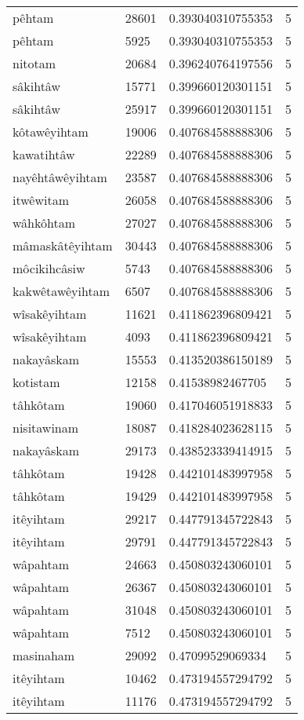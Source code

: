 \begin{longtable}{llll}
pêhtam & 28601 & 0.393040310755353 & 5 \\
pêhtam & 5925 & 0.393040310755353 & 5 \\
nitotam & 20684 & 0.396240764197556 & 5 \\
sâkihtâw & 15771 & 0.399660120301151 & 5 \\
sâkihtâw & 25917 & 0.399660120301151 & 5 \\
kôtawêyihtam & 19006 & 0.407684588888306 & 5 \\
kawatihtâw & 22289 & 0.407684588888306 & 5 \\
nayêhtâwêyihtam & 23587 & 0.407684588888306 & 5 \\
itwêwitam & 26058 & 0.407684588888306 & 5 \\
wâhkôhtam & 27027 & 0.407684588888306 & 5 \\
mâmaskâtêyihtam & 30443 & 0.407684588888306 & 5 \\
môcikihcâsiw & 5743 & 0.407684588888306 & 5 \\
kakwêtawêyihtam & 6507 & 0.407684588888306 & 5 \\
wîsakêyihtam & 11621 & 0.411862396809421 & 5 \\
wîsakêyihtam & 4093 & 0.411862396809421 & 5 \\
nakayâskam & 15553 & 0.413520386150189 & 5 \\
kotistam & 12158 & 0.41538982467705 & 5 \\
tâhkôtam & 19060 & 0.417046051918833 & 5 \\
nisitawinam & 18087 & 0.418284023628115 & 5 \\
nakayâskam & 29173 & 0.438523339414915 & 5 \\
tâhkôtam & 19428 & 0.442101483997958 & 5 \\
tâhkôtam & 19429 & 0.442101483997958 & 5 \\
itêyihtam & 29217 & 0.447791345722843 & 5 \\
itêyihtam & 29791 & 0.447791345722843 & 5 \\
wâpahtam & 24663 & 0.450803243060101 & 5 \\
wâpahtam & 26367 & 0.450803243060101 & 5 \\
wâpahtam & 31048 & 0.450803243060101 & 5 \\
wâpahtam & 7512 & 0.450803243060101 & 5 \\
masinaham & 29092 & 0.47099529069334 & 5 \\
itêyihtam & 10462 & 0.473194557294792 & 5 \\
itêyihtam & 11176 & 0.473194557294792 & 5 \\

\end{longtable}
